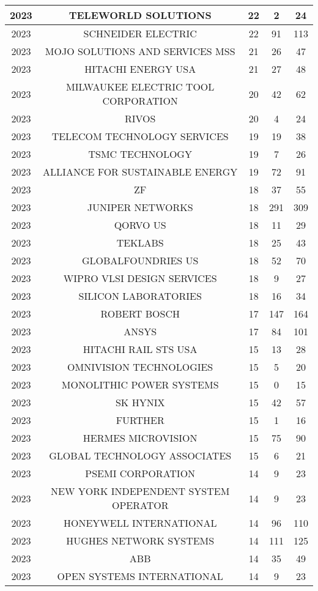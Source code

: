 \documentclass{article}%
\begin{document}
\begin{longtable}{c|c|c|c|c}
\hline%
2023&TELEWORLD SOLUTIONS&22&2&24\\%
\hline%
2023&SCHNEIDER ELECTRIC&22&91&113\\%
\hline%
2023&MOJO SOLUTIONS AND SERVICES MSS&21&26&47\\%
\hline%
2023&HITACHI ENERGY USA&21&27&48\\%
\hline%
2023&MILWAUKEE ELECTRIC TOOL CORPORATION&20&42&62\\%
\hline%
2023&RIVOS&20&4&24\\%
\hline%
2023&TELECOM TECHNOLOGY SERVICES&19&19&38\\%
\hline%
2023&TSMC TECHNOLOGY&19&7&26\\%
\hline%
2023&ALLIANCE FOR SUSTAINABLE ENERGY&19&72&91\\%
\hline%
2023&ZF&18&37&55\\%
\hline%
2023&JUNIPER NETWORKS&18&291&309\\%
\hline%
2023&QORVO US&18&11&29\\%
\hline%
2023&TEKLABS&18&25&43\\%
\hline%
2023&GLOBALFOUNDRIES US&18&52&70\\%
\hline%
2023&WIPRO VLSI DESIGN SERVICES&18&9&27\\%
\hline%
2023&SILICON LABORATORIES&18&16&34\\%
\hline%
2023&ROBERT BOSCH&17&147&164\\%
\hline%
2023&ANSYS&17&84&101\\%
\hline%
2023&HITACHI RAIL STS USA&15&13&28\\%
\hline%
2023&OMNIVISION TECHNOLOGIES&15&5&20\\%
\hline%
2023&MONOLITHIC POWER SYSTEMS&15&0&15\\%
\hline%
2023&SK HYNIX&15&42&57\\%
\hline%
2023&FURTHER&15&1&16\\%
\hline%
2023&HERMES MICROVISION&15&75&90\\%
\hline%
2023&GLOBAL TECHNOLOGY ASSOCIATES&15&6&21\\%
\hline%
2023&PSEMI CORPORATION&14&9&23\\%
\hline%
2023&NEW YORK INDEPENDENT SYSTEM OPERATOR&14&9&23\\%
\hline%
2023&HONEYWELL INTERNATIONAL&14&96&110\\%
\hline%
2023&HUGHES NETWORK SYSTEMS&14&111&125\\%
\hline%
2023&ABB&14&35&49\\%
\hline%
2023&OPEN SYSTEMS INTERNATIONAL&14&9&23\\%

\end{longtable}
\end{document}

